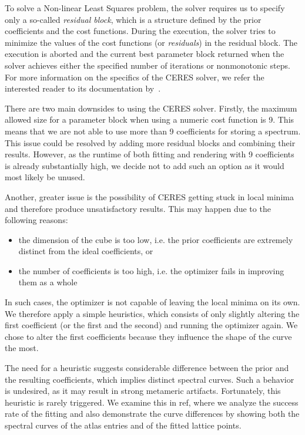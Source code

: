 To solve a Non-linear Least Squares problem, the solver requires us to specify only a so-called \emph{residual block}, which is a structure defined by the prior coefficients and the cost functions. During the execution, the solver tries to minimize the values of the cost functions (or \emph{residuals}) in the residual block. The execution is aborted and the current best parameter block returned when the solver achieves either the specified number of iterations or nonmonotonic steps. For more information on the specifics of the CERES solver, we refer the interested reader to its documentation by~\citet{ceresNonLinearLeastSquares}.

There are two main downsides to using the CERES solver. Firstly, the maximum allowed size for a parameter block when using a numeric cost function is 9. This means that we are not able to use more than 9 coefficients for storing a spectrum. This issue could be resolved by adding more residual blocks and combining their results. However, as the runtime of both fitting and rendering with 9 coefficients is already substantially high, we decide not to add such an option as it would most likely be unused.

Another, greater issue is the possibility of CERES getting stuck in local minima and therefore produce unsatisfactory results. This may happen due to the following reasons:
\begin{itemize} \label{ceresDeficiency}
	\item the dimension of the cube is too low, i.e. the prior coefficients are extremely distinct from the ideal coefficients, or
	\item the number of coefficients is too high, i.e. the optimizer fails in improving them as a whole
\end{itemize}
In such cases, the optimizer is not capable of leaving the local minima on its own. We therefore apply a simple heuristics, which consists of only slightly altering the first coefficient (or the first and the second) and running the optimizer again. We chose to alter the first coefficients because they influence the shape of the curve the most.

The need for a heuristic suggests considerable difference between the prior and the resulting coefficients, which implies distinct spectral curves. Such a behavior is undesired, as it may result in strong metameric artifacts. Fortunately, this heuristic is rarely triggered. We examine this in ref, where we analyze the success rate of the fitting and also demonstrate the curve differences by showing both the spectral curves of the atlas entries and of the fitted lattice points.

